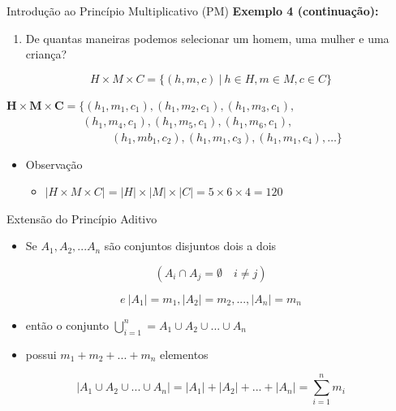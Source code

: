\documentclass[aspectratio=169]{beamer}
\begin{document}
\begin{frame}{Introdução ao Princípio Multiplicativo (PM)}
    \textbf{Exemplo 4 (continuação):}

    \vspace{2mm}
        \begin{enumerate}[a]
                \item De quantas maneiras podemos selecionar um homem,
                uma mulher e uma criança?
        \end{enumerate}

    \vspace{2mm}

    $$H \times M \times C = \{ (h,m,c) ~| ~ h \in H, m \in M, c \in C\}$$

    \vspace{2mm}

\begin{center}
        $\textbf{H} \times \textbf{M} \times \textbf{C} = \{(h_1, m_1, c_1), (h_1, m_2, c_1), (h_1, m_3, c_1),$ \\
    $\quad \quad \quad \quad \quad \quad ~ ~ ~ (h_1, m_4, c_1), (h_1, m_5, c_1), (h_1, m_6, c_1),$ \\
    $\quad \quad \quad \quad \quad \quad \quad \quad \quad ~  (h_1, mb_1, c_2), (h_1, m_1, c_3), (h_1, m_1, c_4), \dots \}$
    
\end{center}

   \begin{itemize}
    \item Observação
    \begin{itemize}
        \item[] $|H \times M \times C| = |H| \times |M| \times |C| = 5 \times 6 \times 4 = 120$
    \end{itemize}
   \end{itemize}

\end{frame}

\begin{frame}{Extensão do Princípio Aditivo}
\begin{itemize}
    \item Se $A_1, A_2, ... A_n$ são conjuntos disjuntos dois a dois
\end{itemize}

$$(A_i \cap A_j = \emptyset \quad i \neq j)$$ 

$$ e ~ |A_1| = m_1, |A_2| = m_2, ..., |A_n| = m_n$$

\vspace{4mm}

\begin{itemize}
    \item[] então o conjunto $\bigcup_{i = 1}^{n}  = A_1 \cup A_2 \cup ... \cup A_n$
    \item[] possui $m_1 + m_2 + ... + m_n$ elementos
\end{itemize}

$$ |A_1 \cup A_2 \cup ... \cup A_n| = |A_1| + |A_2| + ... + |A_n| = \sum_{i=1}^{n} m_i$$
\end{frame}
\end{document}
